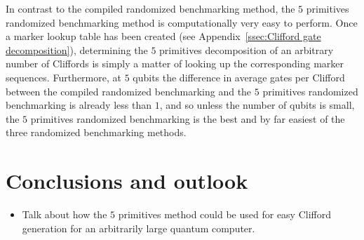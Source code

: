           In contrast to the compiled randomized benchmarking method, the $5$ primitives randomized benchmarking method is computationally very easy to perform. Once a marker lookup table has been created (see Appendix~\ref{ssec:Clifford gate decomposition}), determining the $5$ primitives decomposition of an arbitrary number of Cliffords is simply a matter of looking up the corresponding marker sequences. Furthermore, at $5$ qubits the difference in average gates per Clifford between the compiled randomized benchmarking and the $5$ primitives randomized benchmarking is already less than $1$, and so unless the number of qubits is small, the $5$ primitives randomized benchmarking is the best and by far easiest of the three randomized benchmarking methods.


  \chapter{Conclusions and outlook}
    \begin{itemize}
      \item Talk about how the $5$ primitives method could be used for easy Clifford generation for an arbitrarily large quantum computer.
    \end{itemize}